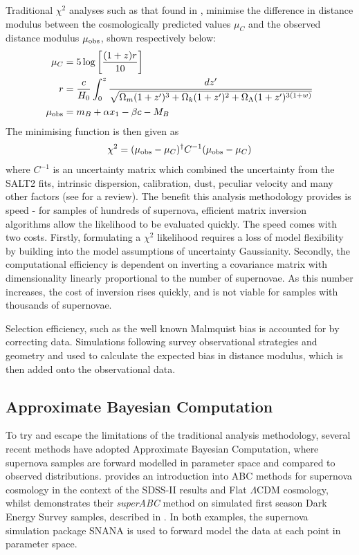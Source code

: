 \documentclass[a4paper,fleqn,usenatbib]{mnras}
\begin{document}
Traditional $\chi^2$ analyses such as that found in \citet{Kowalski2008, Conley2011, Betoule2014}, minimise the difference in distance modulus between the cosmologically predicted values $\mu_C$ and the observed distance modulus $\mu_{\rm obs}$, shown respectively below:
\begin{align}
\mu_C &= 5 \log\left[ \frac{(1+z)r}{10} \right]\\
r& =\frac{c}{H_0} \int_0^z \frac{dz'}{\sqrt{ \Omega_m (1+z')^3 + \Omega_k (1 + z')^2 + \Omega_\Lambda (1+z')^{3(1+w)}}} \\
\mu_{\rm obs} &= m_B + \alpha x_1 - \beta c - M_B
\end{align}
The minimising function is then given as
\begin{equation}
\chi^2 = (\mu_{\rm obs} - \mu_C)^\dagger C^{-1} (\mu_{\rm obs} - \mu_C)
\end{equation}
where $C^{-1}$ is an uncertainty matrix which combined the uncertainty from the SALT2 fits, intrinsic dispersion, calibration, dust, peculiar velocity and many other factors (see \citet{Betoule2014} for a review). The benefit this analysis methodology provides is speed - for samples of hundreds of supernova, efficient matrix inversion algorithms allow the likelihood to be evaluated quickly. The speed comes with two costs. Firstly, formulating a $\chi^2$ likelihood requires a loss of model flexibility by building into the model assumptions of uncertainty Gaussianity. Secondly, the computational efficiency is dependent on inverting a covariance matrix with dimensionality linearly proportional to the number of supernovae. As this number increases, the cost of inversion rises quickly, and is not viable for samples with thousands of supernovae.

Selection efficiency, such as the well known Malmquist bias \citep{MalmquistK.G.1922} is accounted for by correcting data. Simulations following survey observational strategies and geometry and used to calculate the expected bias in distance modulus, which is then added onto the observational data.

\subsection{Approximate Bayesian Computation}

To try and escape the limitations of the traditional analysis methodology, several recent methods have adopted Approximate Bayesian Computation, where supernova samples are forward modelled in parameter space and compared to observed distributions. \citet{Weyant2013} provides an introduction into ABC methods for supernova cosmology in the context of the SDSS-II results \citep{Sako2014} and Flat $\Lambda$CDM cosmology, whilst \citet{Jennings2016} demonstrates their \textit{superABC} method on simulated first season Dark Energy Survey samples, described in \citet{Kessler2015}. In both examples, the supernova simulation package SNANA \citep{Kessler2009a} is used to forward model the data at each point in parameter space.
\end{document}
